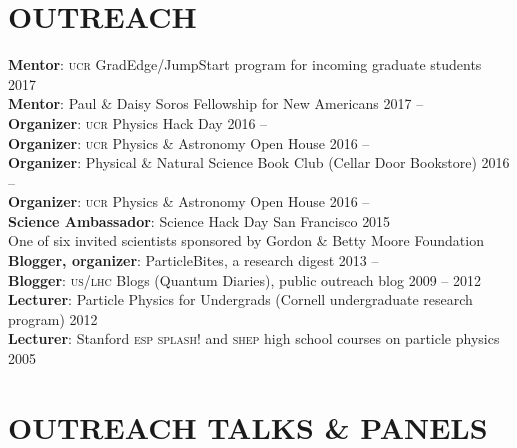 \documentclass[margin,line]{resume}
\newcommand{\scap}[1]{\textsc{\MakeLowercase{#1}}}
\begin{document}
\begin{resume}

\section{\footnotesize \sc
\sffamily 
{}OUTREACH
}

\textbf{Mentor}: \scap{UCR} GradEdge/JumpStart program for incoming graduate students
 \hfill {2017}\\
 \textbf{Mentor}: Paul \& Daisy Soros Fellowship for New Americans
 \hfill {2017 -- \phantom{2016}}\\
%
\textbf{Organizer}: \scap{UCR} Physics Hack Day
 \hfill {2016 -- \phantom{2016}}\\
%
\textbf{Organizer}: \scap{UCR} Physics \& Astronomy Open House 
 \hfill {2016 -- \phantom{2016}}\\
\textbf{Organizer}: Physical \& Natural Science Book Club (Cellar Door Bookstore)
 \hfill {2016 -- \phantom{2016}}\\
%
\textbf{Organizer}: \scap{UCR} Physics \& Astronomy Open House 
 \hfill {2016 -- \phantom{2016}}\\
%
\textbf{Science Ambassador}: Science Hack Day San Francisco 
\hfill {2015}\vspace{-1mm}
\\
%
One of six invited scientists sponsored by Gordon \& Betty Moore Foundation
\\
%
\textbf{Blogger, organizer}: ParticleBites, a research digest 
 \hfill {2013 -- \phantom{2016}}\\
\textbf{Blogger}: \scap{US/LHC} Blogs (Quantum Diaries), public outreach blog \hfill {2009 -- 2012}\\
\textbf{Lecturer}: Particle Physics for Undergrads (Cornell undergraduate research program) \hfill {2012}\\
\textbf{Lecturer}: Stanford \scap{ESP} \scap{SPLASH!} and \scap{SHEP} high school courses on particle physics \hfill {2005}%


\section{\footnotesize \sc
\sffamily 
{}OUTREACH TALKS \& PANELS
}


\end{resume}
\end{document}
